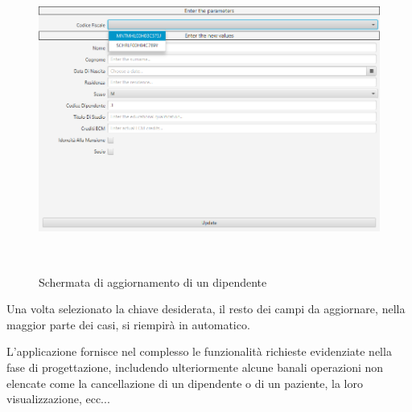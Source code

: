 \documentclass[a4paper, 12pt]{report}
\begin{document}
\begin{figure}[H]
        \centering
        \includegraphics[height=10cm]{img/schermataAggiornaApp.png}
        \caption{Schermata di aggiornamento di un dipendente}
\end{figure}
\noindent
Una volta selezionato la chiave desiderata, il resto dei campi da aggiornare, nella maggior parte dei casi, si riempirà in automatico.

\bigskip
\noindent
L’applicazione fornisce nel complesso le funzionalità richieste evidenziate nella fase di progettazione, includendo 
ulteriormente alcune banali operazioni non elencate come la cancellazione di un dipendente o di un paziente, la loro visualizzazione, ecc...
\end{document}
